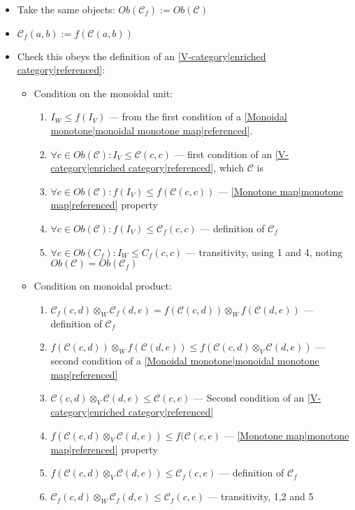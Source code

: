 \begin{itemize}
    \item Take the same objects: $Ob(\mathcal{C}_f):=Ob(\mathcal{C})$
    \item $\mathcal{C}_f(a,b) := f(\mathcal{C}(a,b))$
    \item Check this obeys the definition of an \ref{V-category|enriched category|referenced}:
          \begin{itemize}
            \item Condition on the monoidal unit:
                  \begin{enumerate}
                    \item $I_W \leq f(I_V)$ --- from the first condition of a \ref{Monoidal monotone|monoidal monotone map|referenced}.
                    \item $\forall c \in Ob(\mathcal{C}): I_V \leq \mathcal{C}(c,c)$ --- first condition of an \ref{V-category|enriched category|referenced}, which $\mathcal{C}$ is
                    \item $\forall c \in Ob(\mathcal{C}):f(I_V) \leq f(\mathcal{C}(c,c))$ --- \ref{Monotone map|monotone map|referenced} property
                    \item $\forall c \in Ob(\mathcal{C}):f(I_V) \leq \mathcal{C}_f(c,c)$ --- definition of $\mathcal{C}_f$
                    \item $\forall c \in Ob(C_f): I_W \leq C_f(c,c)$ --- transitivity, using 1 and 4, noting $Ob(\mathcal{C})=Ob(\mathcal{C}_f)$
                  \end{enumerate}
            \item Condition on monoidal product:
                  \begin{enumerate}
                    \item $\mathcal{C}_f(c,d) \otimes_W \mathcal{C}_f(d,e) = f(\mathcal{C}(c,d)) \otimes_W f(\mathcal{C}(d,e))$ --- definition of $\mathcal{C}_f$
                    \item $f(\mathcal{C}(c,d)) \otimes_W f(\mathcal{C}(d,e)) \leq f(\mathcal{C}(c,d) \otimes_V \mathcal{C}(d,e))$  --- second condition of a \ref{Monoidal monotone|monoidal monotone map|referenced}
                    \item $\mathcal{C}(c,d) \otimes_V \mathcal{C}(d,e) \leq \mathcal{C}(c,e)$ --- Second condition of an \ref{V-category|enriched category|referenced}
                    \item $f(\mathcal{C}(c,d) \otimes_V \mathcal{C}(d,e)) \leq f(\mathcal{C}(c,e)$ --- \ref{Monotone map|monotone map|referenced} property
                    \item $f(\mathcal{C}(c,d) \otimes_V \mathcal{C}(d,e)) \leq \mathcal{C}_f(c,e)$ --- definition of $\mathcal{C}_f$
                    \item $\mathcal{C}_f(c,d) \otimes_W \mathcal{C}_f(d,e) \leq \mathcal{C}_f(c,e)$ --- transitivity, 1,2 and 5
                  \end{enumerate}
          \end{itemize}
  \end{itemize}
